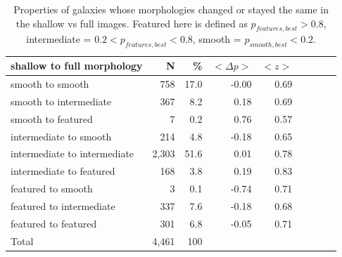 \documentclass[usenatbib]{mn2e}
\begin{document}
\begin{table}
\caption{Properties of galaxies whose morphologies changed or stayed the same in the shallow vs full images. Featured here is defined as $p_{features,best}>0.8$, intermediate = $0.2<p_{features,best}<0.8$, smooth = $p_{smooth,best}<0.2$. \label{tbl:shallow_to_full_stats}}
\begin{tabular}{lrrrrrrrr}
\hline\hline
shallow to full morphology    & N       & \%       & $<\Delta p>$ & $<z>$ \\
\hline
smooth to smooth              & 758     & 17.0     & -0.00        &  0.69\\
smooth to intermediate        & 367     & 8.2      & 0.18         &  0.69\\
smooth to featured            & 7       & 0.2      & 0.76         &  0.57\\ 
intermediate to smooth        & 214     & 4.8      & -0.18        &  0.65\\
intermediate to intermediate  & 2,303   & 51.6     & 0.01         &  0.78 \\
intermediate to featured      & 168     & 3.8      & 0.19         &  0.83\\
featured to smooth            & 3       & 0.1      & -0.74        &  0.71\\
featured to intermediate      & 337     & 7.6      & -0.18        &  0.68\\
featured to featured          & 301     & 6.8      & -0.05        &  0.71\\

Total                         & 4,461   & 100      &              & \\
\hline\hline
\end{tabular}
\end{table}
\end{document}
